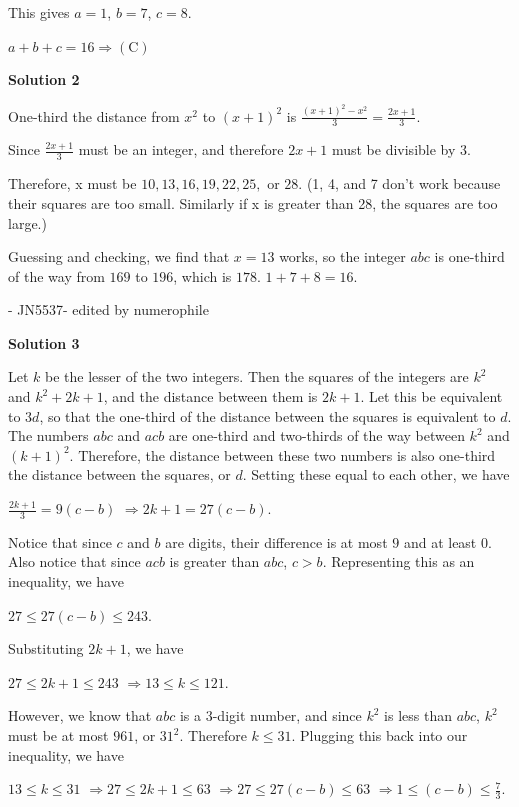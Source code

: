 \begin{enumerate}
 This gives $a=1$, $b=7$, $c=8$.

 $a+b+c = 16 \Rightarrow \mathrm{(C)}$




\textbf{Solution 2}

One-third the distance from $x^2$ to $(x+1)^2$ is $\frac{(x+1)^2 - x^2}{3} = \frac{2x+1}{3}$.

 Since $\frac{2x+1}{3}$ must be an integer, and therefore $2x+1$ must be divisible by $3$. 

 Therefore, x must be $10, 13, 16, 19, 22, 25,$ or $28$. (1, 4, and 7 don't work because their squares are too small. Similarly if x is greater than 28, the squares are too large.)

 Guessing and checking, we find that $x=13$ works, so the integer $abc$ is one-third of the way from $169$ to $196$, which is $178$. $1+7+8 = 16.$

 - JN5537- edited by numerophile

 



\textbf{Solution 3}

Let $k$ be the lesser of the two integers. Then the squares of the integers are $k^2$ and $k^2+2k+1$, and the distance between them is $2k+1$. Let this be equivalent to $3d$, so that the one-third of the distance between the squares is equivalent to $d$. The numbers $abc$ and $acb$ are one-third and two-thirds of the way between $k^2$ and $(k+1)^2$. Therefore, the distance between these two numbers is also one-third the distance between the squares, or $d$. Setting these equal to each other, we have

 
$\frac{2k+1}{3} = 9(c-b)$
$\Rightarrow 2k+1 = 27(c-b)$.

 
Notice that since $c$ and $b$ are digits, their difference is at most $9$ and at least $0$. Also notice that since $acb$ is greater than $abc$, $c > b$. Representing this as an inequality, we have

 
$27 \le 27(c-b) \le 243$.

 
Substituting $2k+1$, we have

 
$27 \le 2k+1 \le 243$
$\Rightarrow 13 \le k \le 121$.

 
However, we know that $abc$ is a $3$-digit number, and since $k^2$ is less than $abc$, $k^2$ must be at most $961$, or $31^2$. Therefore $k \le 31$. Plugging this back into our inequality, we have

 
$13 \le k \le 31$
$\Rightarrow 27 \le 2k+1 \le63$
$\Rightarrow 27 \le 27(c-b) \le 63$
$\Rightarrow 1 \le (c-b) \le \frac{7}{3}$.


\end{enumerate}
